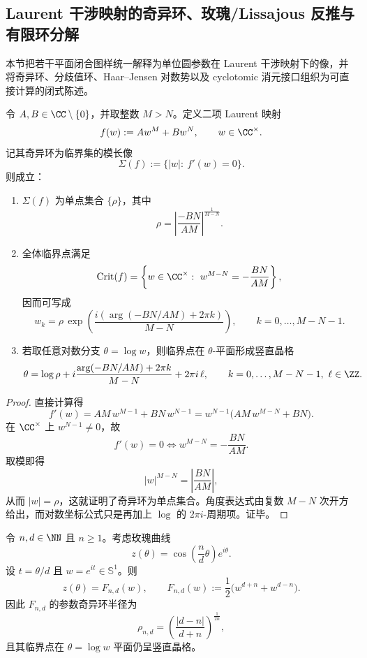 \subsection{Laurent 干涉映射的奇异环、玫瑰/Lissajous 反推与有限环分解}

本节把若干平面闭合图样统一解释为单位圆参数在 Laurent 干涉映射下的像，并将奇异环、分歧值环、Haar--Jensen 对数势以及 cyclotomic 消元接口组织为可直接计算的闭式陈述。

\begin{theorem}\label{thm:derived-two-term-laurent-singular-ring}
令 \(A,B\in\CC\setminus\{0\}\)，并取整数 \(M>N\)。定义二项 Laurent 映射
\[
f(w):=Aw^M+Bw^N,
\qquad
w\in\CC^\times.
\]
记其奇异环为临界集的模长像
\[
\Sigma(f):=\{|w|:\ f'(w)=0\}.
\]
则成立：
\begin{enumerate}
  \item \(\Sigma(f)\) 为单点集合 \(\{\rho\}\)，其中
  \[
  \rho=
  \left|
  \frac{-BN}{AM}
  \right|^{\frac{1}{M-N}}.
  \]
  \item 全体临界点满足
  \[
  \operatorname{Crit}(f)
  =
  \left\{
  w\in\CC^\times:\ w^{M-N}=-\frac{BN}{AM}
  \right\},
  \]
  因而可写成
  \[
  w_k=
  \rho\,
  \exp\!\left(
  \frac{i(\arg(-BN/AM)+2\pi k)}{M-N}
  \right),
  \qquad
  k=0,\dots,M-N-1.
  \]
  \item 若取任意对数分支 \(\theta=\log w\)，则临界点在 \(\theta\)-平面形成竖直晶格
  \[
  \theta=
  \log\rho
  +
  i\frac{\arg(-BN/AM)+2\pi k}{M-N}
  +
  2\pi i\,\ell,
  \qquad
  k=0,\dots,M-N-1,\ \ell\in\ZZ.
  \]
\end{enumerate}
\end{theorem}

\begin{proof}
直接计算得
\[
f'(w)=AM\,w^{M-1}+BN\,w^{N-1}
=
w^{N-1}\bigl(AM\,w^{M-N}+BN\bigr).
\]
在 \(\CC^\times\) 上 \(w^{N-1}\neq 0\)，故
\[
f'(w)=0
\iff
w^{M-N}=-\frac{BN}{AM}.
\]
取模即得
\[
|w|^{M-N}=
\left|
\frac{BN}{AM}
\right|,
\]
从而 \(|w|=\rho\)，这就证明了奇异环为单点集合。角度表达式由复数 \(M-N\) 次开方给出，而对数坐标公式只是再加上 \(\log\) 的 \(2\pi i\)-周期项。证毕。
\end{proof}

\begin{corollary}[玫瑰曲线的单位圆反推与参数奇异环半径]\label{cor:derived-rose-laurent-singular-ring}
令 \(n,d\in\NN\) 且 \(n\ge 1\)。考虑玫瑰曲线
\[
z(\theta)=\cos\!\left(\frac{n}{d}\theta\right)e^{i\theta}.
\]
设 \(t=\theta/d\) 且 \(w=e^{it}\in\mathbb S^1\)。则
\[
z(\theta)=F_{n,d}(w),
\qquad
F_{n,d}(w):=\frac12\bigl(w^{d+n}+w^{d-n}\bigr).
\]
因此 \(F_{n,d}\) 的参数奇异环半径为
\[
\rho_{n,d}
=
\left(\frac{|d-n|}{d+n}\right)^{\frac{1}{2n}},
\]
且其临界点在 \(\theta=\log w\) 平面仍呈竖直晶格。
\end{corollary}

